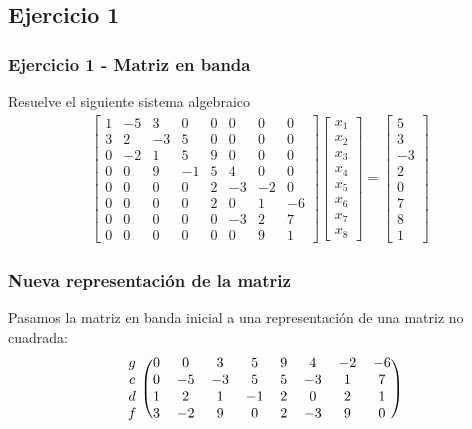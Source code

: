 \subsection{Ejercicio 1}
\begin{frame}[plain]
\frametitle{Ejercicio 1 - Matriz en banda}
Resuelve el siguiente sistema algebraico
\begin{align*}
\begin{bmatrix}
1 & -5 & 3 & 0 & 0 & 0 & 0 & 0 \\
3 & 2 & -3 & 5 & 0 & 0 & 0 & 0 \\
0 & -2 & 1 & 5 & 9 & 0 & 0 & 0 \\
0 & 0 & 9 & -1 & 5 & 4 & 0 & 0 \\
0 & 0 & 0 & 0 & 2 & -3 & -2 & 0 \\
0 & 0 & 0 & 0 & 2 & 0 & 1 & -6 \\
0 & 0 & 0 & 0 & 0 & -3 & 2 & 7 \\
0 & 0 & 0 & 0 & 0 & 0 & 9 & 1 
\end{bmatrix}
\begin{bmatrix}
x_{1} \\
x_{2} \\
x_{3} \\
x_{4} \\
x_{5} \\
x_{6} \\
x_{7} \\
x_{8}
\end{bmatrix}
=
\begin{bmatrix}
5 \\
3 \\
-3 \\
2 \\
0 \\
7 \\
8 \\
1
\end{bmatrix}
\end{align*}
\end{frame}
\begin{frame}
\frametitle{Nueva representación de la matriz}
Pasamos la matriz en banda inicial a una representación de una matriz no cuadrada:
\\
\bigskip
\pause
\begin{align*}
\begin{blockarray}{ccccccccc}
\begin{block}{c(cccccccc)}
g & 0 & 0 & 3 & 5 & 9 & 4 & -2 & -6 \\
c & 0 & -5 & -3 & 5 & 5 & -3 & 1 & 7 \\
d & 1 & 2 & 1 & -1 & 2 & 0 & 2 & 1 \\
f & 3 & -2 & 9 & 0 & 2 & -3 & 9 & 0 \\
\end{block}
\end{blockarray}
\end{align*}
\end{frame}
